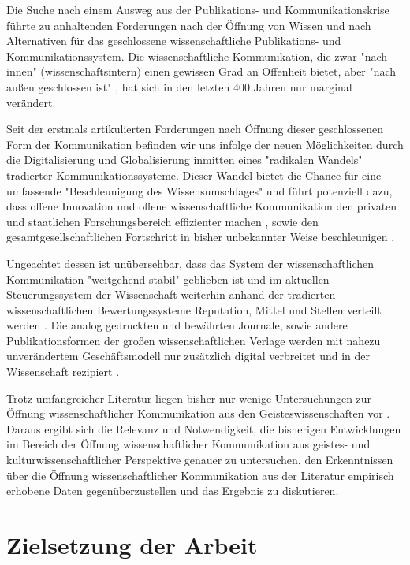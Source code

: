 Die Suche nach einem Ausweg aus der Publikations- und Kommunikationskrise führte zu anhaltenden Forderungen nach der Öffnung von Wissen und nach Alternativen für das geschlossene wissenschaftliche Publikations- und Kommunikationssystem. Die wissenschaftliche Kommunikation, die zwar "nach innen" (wissenschaftsintern) einen gewissen Grad an Offenheit bietet, aber "nach außen geschlossen ist" \cite{kelty_2004}, hat sich in den letzten 400 Jahren nur marginal verändert.

Seit der erstmals artikulierten Forderungen nach Öffnung dieser geschlossenen Form der Kommunikation befinden wir uns infolge der neuen Möglichkeiten durch die Digitalisierung und Globalisierung \cite{mcluhan_1962_gutenberg} inmitten eines "radikalen Wandels" \cite{poynder_2011_suber} tradierter Kommunikationssysteme. Dieser Wandel bietet die Chance für eine umfassende "Beschleunigung des Wissensumschlages" \cite{Wenzel_2003} und führt potenziell dazu, dass offene Innovation und offene wissenschaftliche Kommunikation den privaten und staatlichen Forschungsbereich effizienter machen \cite{chesbrough_2006_open}, sowie den gesamtgesellschaftlichen Fortschritt in bisher unbekannter Weise beschleunigen \cite{cite:7}.

Ungeachtet dessen ist unübersehbar, dass das System der wissenschaftlichen Kommunikation "weitgehend stabil" \cite{Hanekop_2014} geblieben ist und im aktuellen Steuerungssystem der Wissenschaft weiterhin anhand der tradierten wissenschaftlichen Bewertungssysteme Reputation, Mittel und Stellen verteilt werden \cite{cite:4}. Die analog gedruckten und bewährten Journale, sowie andere Publikationsformen der großen wissenschaftlichen Verlage werden mit nahezu unverändertem Geschäftsmodell nur zusätzlich digital verbreitet \cite{Hanekop_2014} \cite{boai_2012} und in der Wissenschaft rezipiert \cite{suchen}.

Trotz umfangreicher Literatur liegen bisher nur wenige Untersuchungen zur Öffnung wissenschaftlicher Kommunikation aus den Geisteswissenschaften vor \cite{naeder_2010_open}. Daraus ergibt sich die Relevanz und Notwendigkeit, die bisherigen Entwicklungen im Bereich der Öffnung wissenschaftlicher Kommunikation aus geistes- und kulturwissenschaftlicher Perspektive genauer zu untersuchen, den Erkenntnissen über die Öffnung wissenschaftlicher Kommunikation aus der Literatur empirisch erhobene Daten gegenüberzustellen und das Ergebnis zu diskutieren.

\section{Zielsetzung der Arbeit}


